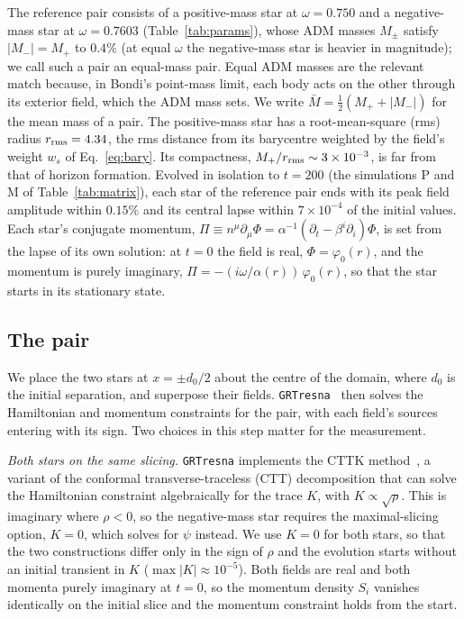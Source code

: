 \documentclass[twocolumn,floatfix,aps,prd,superscriptaddress,nofootinbib]{revtex4-2}
\begin{document}
The reference pair consists of a positive-mass star at $\omega=0.750$ and a negative-mass star at $\omega=0.7603$ (Table~\ref{tab:params}), whose ADM masses $M_\pm$ satisfy $|M_-|=M_+$ to $0.4\%$ (at equal $\omega$ the negative-mass star is heavier in magnitude); we call such a pair an equal-mass pair. Equal ADM masses are the relevant match because, in Bondi's point-mass limit, each body acts on the other through its exterior field, which the ADM mass sets. We write $\bar M=\tfrac12(M_++|M_-|)$ for the mean mass of a pair. The positive-mass star has a root-mean-square (rms) radius $r_{\rm rms}=4.34$, the rms distance from its barycentre weighted by the field's weight $w_s$ of Eq.~\eqref{eq:bary}. Its compactness, $M_+/r_{\rm rms}\sim3\times10^{-3}$, is far from that of horizon formation. Evolved in isolation to $t=200$ (the simulations P and M of Table~\ref{tab:matrix}), each star of the reference pair ends with its peak field amplitude within $0.15\%$ and its central lapse within $7\times10^{-4}$ of the initial values. Each star's conjugate momentum, $\Pi\equiv n^\mu\partial_\mu\Phi=\alpha^{-1}(\partial_t-\beta^i\partial_i)\Phi$, is set from the lapse of its own solution: at $t=0$ the field is real, $\Phi=\varphi_0(r)$, and the momentum is purely imaginary, $\Pi=-(i\omega/\alpha(r))\,\varphi_0(r)$, so that the star starts in its stationary state.

\subsection{The pair}
\label{sec:construction}

We place the two stars at $x=\pm d_0/2$ about the centre of the domain, where $d_0$ is the initial separation, and superpose their fields. \texttt{GRTresna}~\cite{grtresna} then solves the Hamiltonian and momentum constraints for the pair, with each field's sources entering with its sign. Two choices in this step matter for the measurement.

\emph{Both stars on the same slicing.} \texttt{GRTresna} implements the CTTK method~\cite{cttk}, a variant of the conformal transverse-traceless (CTT) decomposition that can solve the Hamiltonian constraint algebraically for the trace $K$, with $K\propto\sqrt{\rho}$. This is imaginary where $\rho<0$, so the negative-mass star requires the maximal-slicing option, $K=0$, which solves for $\psi$ instead. We use $K=0$ for both stars, so that the two constructions differ only in the sign of $\rho$ and the evolution starts without an initial transient in $K$ ($\max|K|\approx10^{-5}$). Both fields are real and both momenta purely imaginary at $t=0$, so the momentum density $S_i$ vanishes identically on the initial slice and the momentum constraint holds from the start.
\end{document}
